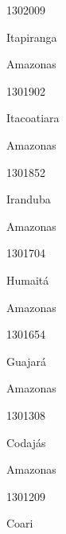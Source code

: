 \documentclass[
  letterpaper,
]{report}
\begin{document}
1302009

\n      

Itapiranga

\n    

\n    

\n      

Amazonas

\n      

1301902

\n      

Itacoatiara

\n    

\n    

\n      

Amazonas

\n      

1301852

\n      

Iranduba

\n    

\n    

\n      

Amazonas

\n      

1301704

\n      

Humaitá

\n    

\n    

\n      

Amazonas

\n      

1301654

\n      

Guajará

\n    

\n    

\n      

Amazonas

\n      

1301308

\n      

Codajás

\n    

\n    

\n      

Amazonas

\n      

1301209

\n      

Coari

\n    

\n    
\end{document}
